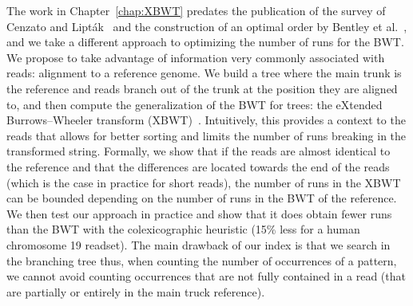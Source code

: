 The work in Chapter~\ref{chap:XBWT} predates the publication of the survey of Cenzato and Lipták~\cite{cenzato_et_al_BWT_Collections} and the construction of an optimal order by Bentley et al.~\cite{bentley2019complexity}, and we take a different approach to optimizing the number of runs for the BWT. We propose to take advantage of information very commonly associated with reads: alignment to a reference genome. We build a tree where the main trunk is the reference and reads branch out of the trunk at the position they are aligned to, and then compute the generalization of the BWT for trees: the eXtended Burrows--Wheeler transform (XBWT)~\cite{ferragina2009compressing}. Intuitively, this provides a context to the reads that allows for better sorting and limits the number of runs breaking in the transformed string. Formally, we show that if the reads are almost identical to the reference and that the differences are located towards the end of the reads (which is the case in practice for short reads), the number of runs in the XBWT can be bounded depending on the number of runs in the BWT of the reference. We then test our approach in practice and show that it does obtain fewer runs than the BWT with the colexicographic heuristic (15\% less for a human chromosome 19 readset).
The main drawback of our index is that we search in the branching tree thus, when counting the number of occurrences of a pattern, we cannot avoid counting occurrences that are not fully contained in a read (that are partially or entirely in the main truck reference).

